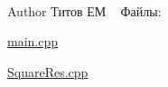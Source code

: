 ~\newline
\begin{DoxyAuthor}{Author}
Титов ЕМ ~\newline
Файлы\+: ~\newline

\begin{DoxyItemize}
\item \hyperlink{main_8cpp}{main.\+cpp}
\item \hyperlink{_square_res_8cpp}{Square\+Res.\+cpp} 
\end{DoxyItemize}
\end{DoxyAuthor}
